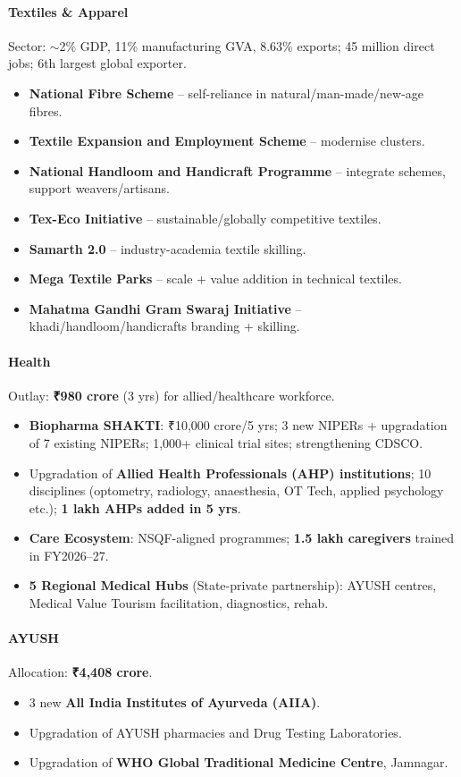 \paragraph{Textiles \& Apparel} Sector: $\sim$2\% GDP, 11\% manufacturing GVA, 8.63\% exports; 45 million direct jobs; 6th largest global exporter.
\begin{itemize}
  \item \textbf{National Fibre Scheme} -- self-reliance in natural/man-made/new-age fibres.
  \item \textbf{Textile Expansion and Employment Scheme} -- modernise clusters.
  \item \textbf{National Handloom and Handicraft Programme} -- integrate schemes, support weavers/artisans.
  \item \textbf{Tex-Eco Initiative} -- sustainable/globally competitive textiles.
  \item \textbf{Samarth 2.0} -- industry-academia textile skilling.
  \item \textbf{Mega Textile Parks} -- scale + value addition in technical textiles.
  \item \textbf{Mahatma Gandhi Gram Swaraj Initiative} -- khadi/handloom/handicrafts branding + skilling.
\end{itemize}

\paragraph{Health} Outlay: \textbf{₹980 crore} (3 yrs) for allied/healthcare workforce.
\begin{itemize}
  \item \textbf{Biopharma SHAKTI}: ₹10,000 crore/5 yrs; 3 new NIPERs + upgradation of 7 existing NIPERs; 1,000+ clinical trial sites; strengthening CDSCO.
  \item Upgradation of \textbf{Allied Health Professionals (AHP) institutions}; 10 disciplines (optometry, radiology, anaesthesia, OT Tech, applied psychology etc.); \textbf{1 lakh AHPs added in 5 yrs}.
  \item \textbf{Care Ecosystem}: NSQF-aligned programmes; \textbf{1.5 lakh caregivers} trained in FY2026--27.
  \item \textbf{5 Regional Medical Hubs} (State-private partnership): AYUSH centres, Medical Value Tourism facilitation, diagnostics, rehab.
\end{itemize}

\paragraph{AYUSH} Allocation: \textbf{₹4,408 crore}.
\begin{itemize}
  \item 3 new \textbf{All India Institutes of Ayurveda (AIIA)}.
  \item Upgradation of AYUSH pharmacies and Drug Testing Laboratories.
  \item Upgradation of \textbf{WHO Global Traditional Medicine Centre}, Jamnagar.
\end{itemize}

